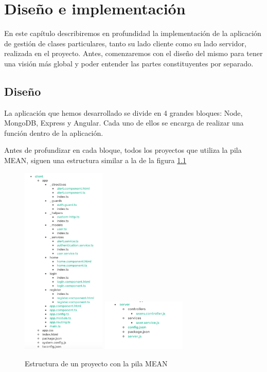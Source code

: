 \chapter{Diseño e implementación}

En este capítulo describiremos en profundidad la implementación de la aplicación de gestión de clases particulares, tanto su lado cliente como su lado servidor, realizada en el proyecto. Antes, comenzaremos con el diseño del mismo para tener una visión más global y poder entender las partes constituyentes por separado.

\section{Diseño}

La aplicación que hemos desarrollado se divide en 4 grandes bloques: Node, MongoDB, Express y Angular. Cada uno de ellos se encarga de realizar una función dentro de la aplicación.

Antes de profundizar en cada bloque, todos los proyectos que utiliza la pila MEAN, siguen una estructura similar a la de la figura \ref{img:EstructuraMean}

\begin{figure}[!h]
    \centering
    \includegraphics[width=40mm]{img/aplicacion/cliente.png}
    \includegraphics[width=40mm]{img/aplicacion/server.png}
    \caption{Estructura de un proyecto con la pila MEAN}
    \label{img:EstructuraMean}
\end{figure}
